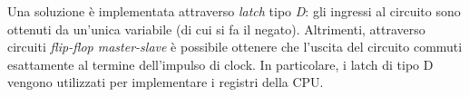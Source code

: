 \documentclass[class=book, crop=false, oneside]{standalone}
\begin{document}
Una soluzione è implementata attraverso \emph{latch} tipo \emph{D}: gli ingressi al circuito sono ottenuti da un'unica variabile (di cui si fa il negato). Altrimenti, attraverso circuiti \emph{flip-flop master-slave} è possibile ottenere che l’uscita del circuito commuti esattamente al termine dell’impulso di clock. In particolare, i latch di tipo D vengono utilizzati per implementare i registri della CPU.
\end{document}
